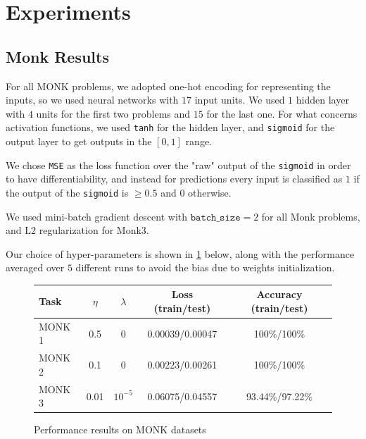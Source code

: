 \section{Experiments}

\subsection{Monk Results}

For all MONK problems, we adopted one-hot encoding for representing the inputs, so we used neural networks with $17$ input units. We used $1$ hidden layer with $4$ units for the first two problems and $15$ for the last one. For what concerns activation functions, we used \texttt{tanh} for the hidden layer, and \texttt{sigmoid} for the output layer to get outputs in the $[0, 1]$ range.

We chose \texttt{MSE} as the loss function over the "raw" output of the \texttt{sigmoid} in order to have differentiability, and instead for predictions every input is classified as $1$ if the output of the \texttt{sigmoid} is $\ge 0.5$ and $0$ otherwise.

We used mini-batch gradient descent with $\texttt{batch\_size}=2$ for all Monk problems, and L2 regularization for Monk3.

Our choice of hyper-parameters is shown in \cref{fig:hyper} below, along with the performance averaged over $5$ different runs to avoid the bias due to weights initialization.

\begin{figure}[h]
    \centering
    \begin{tabular}{|l|c|c|c|c|}
        \hline 
        Task & $\eta$ & $\lambda$ & Loss (train/test) & Accuracy (train/test) \\ \hline
        MONK 1 & 0.5 & 0 & 0.00039/0.00047  & 100\%/100\% \\ \hline
        MONK 2 & 0.1 & 0 & 0.00223/0.00261 & 100\%/100\% \\ \hline
        MONK 3 & 0.01 & $10^{-5}$ & 0.06075/0.04557 & 93.44\%/97.22\% \\ \hline
    \end{tabular}
    \caption{Performance results on MONK datasets}
    \label{fig:hyper}
\end{figure}

